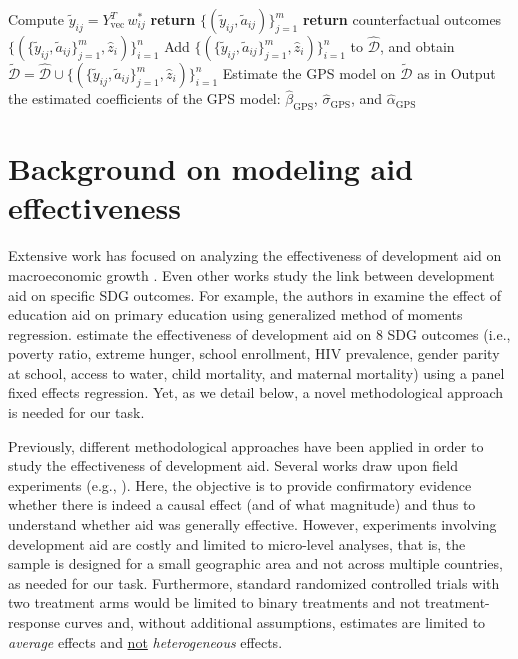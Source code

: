 \documentclass[sigconf]{acmart}
\begin{document}
\begin{algorithm}[htbp]
\begin{algorithmic}[1]
        \State Compute $\tilde{y}_{ij} = Y_{\mathrm{vec}}^T \, w_{ij}^*$
    \EndFor
    \State \textbf{return} $\{ ( \tilde{y}_{ij}, \tilde{a}_{ij}) \}_{j=1}^m$
\EndFor
\State \textbf{return} counterfactual outcomes $
\big \{ (\{ \tilde{y}_{ij}, \tilde{a}_{ij} \}_{j=1}^m , \hat{z}_i) \big \}_{i=1}^{n}$
\State Add $
\big \{ (\{ \tilde{y}_{ij}, \tilde{a}_{ij} \}_{j=1}^m , \hat{z}_i) \big \}_{i=1}^{n}$ to $\hat{\mathcal{D}}$, and obtain $\tilde{\mathcal{D}} = \hat{\mathcal{D}} \cup \big \{ (\{ \tilde{y}_{ij}, \tilde{a}_{ij} \}_{j=1}^m , \hat{z}_i) \big \}_{i=1}^{n}$
\vspace{0.3cm}
\State Estimate the GPS model on $\tilde{\mathcal{D}}$ as in \cite{Hirano2004} 
\State Output the estimated coefficients of the GPS model: $\hat{\beta}_{\mathrm{GPS}}$, $\hat{\sigma}_{\mathrm{GPS}}$, and $\hat{\alpha}_{\mathrm{GPS}}$
\end{algorithmic}
\end{algorithm}

\newpage



\section{Background on modeling aid effectiveness} 
\label{supp:lit_aid_effect} %

Extensive work has focused on analyzing the effectiveness of development aid on macroeconomic growth \cite{Lesink2000, Hansen2000, Doucouliagos2009}. Even other works study the link between development aid on specific SDG outcomes. For example, the authors in \cite{Birchler2016} examine the effect of education aid on primary education using generalized method of moments regression. \cite{Munyanyi2020} estimate the effectiveness of development aid on 8 SDG outcomes (i.e., poverty ratio, extreme hunger, school enrollment, HIV prevalence, gender parity at school, access to water, child mortality, and maternal mortality) using a panel fixed effects regression. Yet, as we detail below, a novel methodological approach is needed for our task. 

Previously, different methodological approaches have been applied in order to study the effectiveness of development aid. Several works draw upon field experiments (e.g., \cite{Duflo2003, Duflo2006}). Here, the objective is to provide confirmatory evidence whether there is indeed a causal effect (and of what magnitude) and thus to understand whether aid was generally effective. However, experiments involving development aid are costly and limited to micro-level analyses, that is, the sample is designed for a small geographic area and not across multiple countries, as needed for our task. Furthermore, standard randomized controlled trials with two treatment arms would be limited to binary treatments and not treatment-response curves and, without additional assumptions, estimates are limited to \emph{average} effects and \underline{not} \emph{heterogeneous} effects. 
\end{document}
